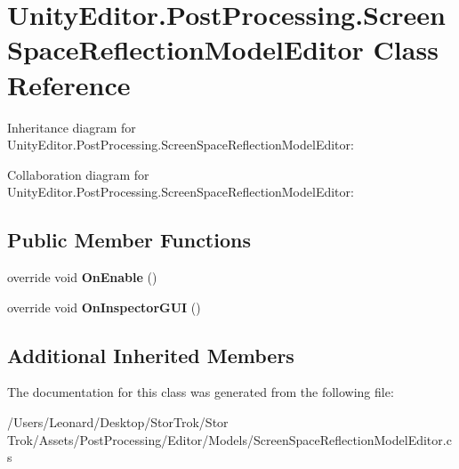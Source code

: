 \hypertarget{class_unity_editor_1_1_post_processing_1_1_screen_space_reflection_model_editor}{}\section{Unity\+Editor.\+Post\+Processing.\+Screen\+Space\+Reflection\+Model\+Editor Class Reference}
\label{class_unity_editor_1_1_post_processing_1_1_screen_space_reflection_model_editor}


Inheritance diagram for Unity\+Editor.\+Post\+Processing.\+Screen\+Space\+Reflection\+Model\+Editor\+:


Collaboration diagram for Unity\+Editor.\+Post\+Processing.\+Screen\+Space\+Reflection\+Model\+Editor\+:
\subsection*{Public Member Functions}
\begin{DoxyCompactItemize}
\item 
\mbox{\label{class_unity_editor_1_1_post_processing_1_1_screen_space_reflection_model_editor_a82b863023f5322483c601ce1bcc254d1}} 
override void {\bfseries On\+Enable} ()
\item 
\mbox{\label{class_unity_editor_1_1_post_processing_1_1_screen_space_reflection_model_editor_afa95d659e07fb98f2c08129dc2a51ca1}} 
override void {\bfseries On\+Inspector\+G\+UI} ()
\end{DoxyCompactItemize}
\subsection*{Additional Inherited Members}


The documentation for this class was generated from the following file\+:\begin{DoxyCompactItemize}
\item 
/\+Users/\+Leonard/\+Desktop/\+Stor\+Trok/\+Stor Trok/\+Assets/\+Post\+Processing/\+Editor/\+Models/Screen\+Space\+Reflection\+Model\+Editor.\+cs\end{DoxyCompactItemize}
